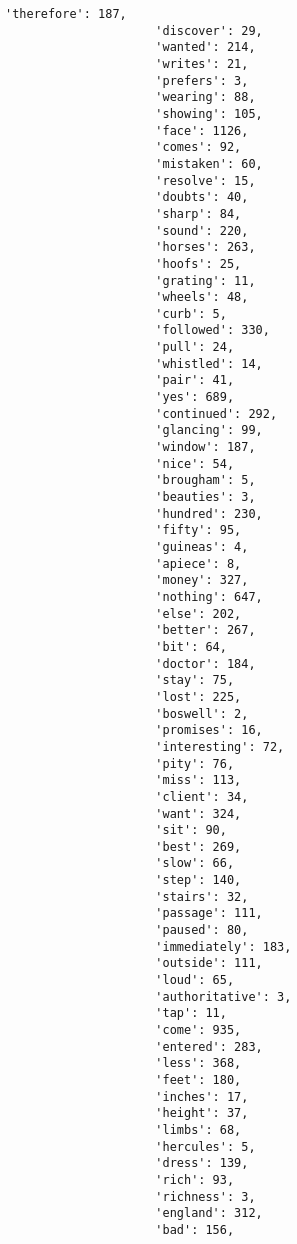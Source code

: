 \documentclass[11pt]{article}
\begin{document}
\begin{Verbatim}[commandchars=\\\{\}]
                     'therefore': 187,
                     'discover': 29,
                     'wanted': 214,
                     'writes': 21,
                     'prefers': 3,
                     'wearing': 88,
                     'showing': 105,
                     'face': 1126,
                     'comes': 92,
                     'mistaken': 60,
                     'resolve': 15,
                     'doubts': 40,
                     'sharp': 84,
                     'sound': 220,
                     'horses': 263,
                     'hoofs': 25,
                     'grating': 11,
                     'wheels': 48,
                     'curb': 5,
                     'followed': 330,
                     'pull': 24,
                     'whistled': 14,
                     'pair': 41,
                     'yes': 689,
                     'continued': 292,
                     'glancing': 99,
                     'window': 187,
                     'nice': 54,
                     'brougham': 5,
                     'beauties': 3,
                     'hundred': 230,
                     'fifty': 95,
                     'guineas': 4,
                     'apiece': 8,
                     'money': 327,
                     'nothing': 647,
                     'else': 202,
                     'better': 267,
                     'bit': 64,
                     'doctor': 184,
                     'stay': 75,
                     'lost': 225,
                     'boswell': 2,
                     'promises': 16,
                     'interesting': 72,
                     'pity': 76,
                     'miss': 113,
                     'client': 34,
                     'want': 324,
                     'sit': 90,
                     'best': 269,
                     'slow': 66,
                     'step': 140,
                     'stairs': 32,
                     'passage': 111,
                     'paused': 80,
                     'immediately': 183,
                     'outside': 111,
                     'loud': 65,
                     'authoritative': 3,
                     'tap': 11,
                     'come': 935,
                     'entered': 283,
                     'less': 368,
                     'feet': 180,
                     'inches': 17,
                     'height': 37,
                     'limbs': 68,
                     'hercules': 5,
                     'dress': 139,
                     'rich': 93,
                     'richness': 3,
                     'england': 312,
                     'bad': 156,

\end{Verbatim}
\end{document}
